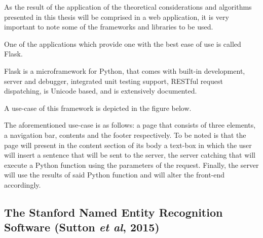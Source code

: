 \documentclass[12pt,a4paper]{article}
\begin{document}
\qquad \quad As the result of the application of the theoretical considerations and algorithms presented in this thesis will be comprised in a web application, it is very important to note some of the frameworks and libraries to be used.

\qquad One of the applications which provide one with the best ease of use is called Flask.

\qquad Flask is a microframework for Python, that comes with built-in development, server and debugger, integrated unit testing support, RESTful request dispatching, is Unicode based, and is extensively documented.

\qquad A use-case of this framework is depicted in the figure below.

\begin{figure}[h!]
\begin{center}
\end{center}

\end{figure}

\qquad The aforementioned use-case is as follows: a page that consists of three elements, a navigation bar, contents and the footer respectively. To be noted is that the page will present in the content section of its body a text-box in which the user will insert a sentence that will be sent to the server, the server catching that will execute a Python function using the parameters of the request. Finally, the server will use the results of said Python function and will alter the front-end accordingly.


\subsection{The Stanford Named Entity Recognition Software (Sutton \textit{et al}, 2015)}
\end{document}
